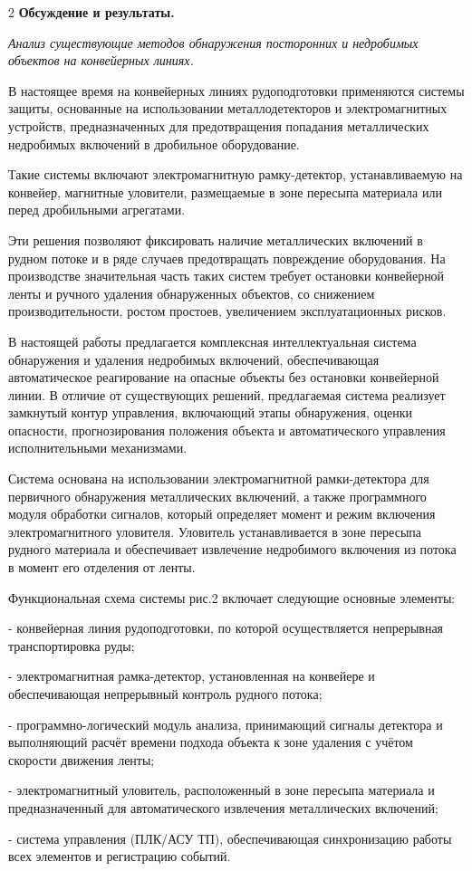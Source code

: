 \begin{multicols}{2}
{\bfseries Обсуждение и результаты.}

\emph{Анализ существующие методов обнаружения посторонних и недробимых
объектов на конвейерных линиях.}

В настоящее время на конвейерных линиях рудоподготовки применяются
системы защиты, основанные на использовании металлодетекторов и
электромагнитных устройств, предназначенных для предотвращения попадания
металлических недробимых включений в дробильное оборудование.

Такие системы включают электромагнитную рамку-детектор, устанавливаемую
на конвейер, магнитные уловители, размещаемые в зоне пересыпа материала
или перед дробильными агрегатами.

Эти решения позволяют фиксировать наличие металлических включений в
рудном потоке и в ряде случаев предотвращать повреждение оборудования.
На производстве значительная часть таких систем требует остановки
конвейерной ленты и ручного удаления обнаруженных объектов, со снижением
производительности, ростом простоев, увеличением эксплуатационных
рисков.

В настоящей работы предлагается комплексная интеллектуальная система
обнаружения и удаления недробимых включений, обеспечивающая
автоматическое реагирование на опасные объекты без остановки конвейерной
линии. В отличие от существующих решений, предлагаемая система реализует
замкнутый контур управления, включающий этапы обнаружения, оценки
опасности, прогнозирования положения объекта и автоматического
управления исполнительными механизмами.

Система основана на использовании электромагнитной рамки-детектора для
первичного обнаружения металлических включений, а также программного
модуля обработки сигналов, который определяет момент и режим включения
электромагнитного уловителя. Уловитель устанавливается в зоне пересыпа
рудного материала и обеспечивает извлечение недробимого включения из
потока в момент его отделения от ленты.

Функциональная схема системы рис.2 включает следующие основные элементы:

- конвейерная линия рудоподготовки, по которой
осуществляется непрерывная транспортировка руды;

- электромагнитная рамка-детектор, установленная на конвейере и
обеспечивающая непрерывный контроль рудного потока;

- программно-логический модуль анализа, принимающий сигналы
детектора и выполняющий расчёт времени подхода объекта к зоне удаления с
учётом скорости движения ленты;

- электромагнитный уловитель, расположенный в зоне пересыпа
материала и предназначенный для автоматического извлечения металлических
включений;

- система управления (ПЛК/АСУ ТП), обеспечивающая
синхронизацию работы всех элементов и регистрацию событий.
\end{multicols}

